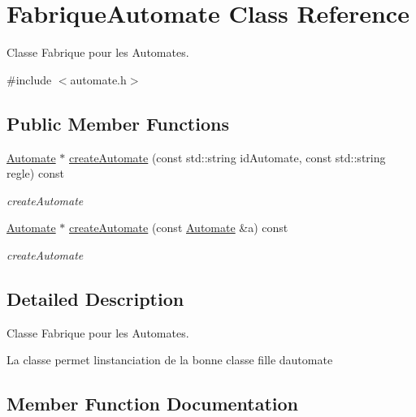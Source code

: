 \hypertarget{class_fabrique_automate}{}\section{Fabrique\+Automate Class Reference}
\label{class_fabrique_automate}


Classe Fabrique pour les Automates.  




{\ttfamily \#include $<$automate.\+h$>$}

\subsection*{Public Member Functions}
\begin{DoxyCompactItemize}
\item 
\mbox{\hyperlink{class_automate}{Automate}} $\ast$ \mbox{\hyperlink{class_fabrique_automate_a808b4465ee8056afef19399bfede9379}{create\+Automate}} (const std\+::string id\+Automate, const std\+::string regle) const
\begin{DoxyCompactList}\small\item\em create\+Automate \end{DoxyCompactList}\item 
\mbox{\hyperlink{class_automate}{Automate}} $\ast$ \mbox{\hyperlink{class_fabrique_automate_af823218761c226da59dcbaafc50e9d05}{create\+Automate}} (const \mbox{\hyperlink{class_automate}{Automate}} \&a) const
\begin{DoxyCompactList}\small\item\em create\+Automate \end{DoxyCompactList}\end{DoxyCompactItemize}


\subsection{Detailed Description}
Classe Fabrique pour les Automates. 

La classe permet l\textquotesingle{}instanciation de la bonne classe fille d\textquotesingle{}automate 

\subsection{Member Function Documentation}
\mbox{\label{class_fabrique_automate_a808b4465ee8056afef19399bfede9379}} 
